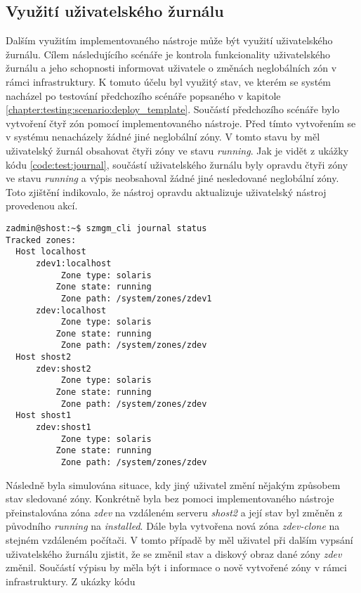 \subsection{Využití uživatelského žurnálu}
\label{chapter:testing:scenario:journal}
Dalším využitím implementovaného nástroje může být využití uživatelského žurnálu. Cílem následujícího scénáře je kontrola 
funkcionality uživatelského žurnálu a jeho schopnosti informovat uživatele o změnách neglobálních zón v rámci infrastruktury.
K tomuto účelu byl využitý stav, ve kterém se systém nacházel po testování předchozího scénáře popsaného v kapitole
\ref{chapter:testing:scenario:deploy_template}. Součástí předchozího scénáře bylo vytvoření čtyř zón pomocí implementovaného
nástroje. Před tímto vytvořením se v systému nenacházely žádné jiné neglobální zóny. V tomto stavu by měl uživatelský žurnál 
obsahovat čtyři zóny ve stavu \textit{running}. Jak je vidět z ukážky kódu \ref{code:test:journal}, součástí uživatelského
žurnálu byly opravdu čtyři zóny ve stavu \textit{running} a výpis neobsahoval žádné jiné nesledované neglobální zóny.
Toto zjištění indikovalo, že nástroj opravdu aktualizuje uživatelský nástroj provedenou akcí.
\begin{lstlisting}[basicstyle=\scriptsize\ttfamily, caption={Uživatelské žurnál po vytvoření zón}, float,label={code:test:journal}]  
zadmin@shost:~$ szmgm_cli journal status
Tracked zones:
  Host localhost
      zdev1:localhost
           Zone type: solaris
          Zone state: running
           Zone path: /system/zones/zdev1
      zdev:localhost
           Zone type: solaris
          Zone state: running
           Zone path: /system/zones/zdev
  Host shost2
      zdev:shost2
           Zone type: solaris
          Zone state: running                      
           Zone path: /system/zones/zdev
  Host shost1
      zdev:shost1
           Zone type: solaris
          Zone state: running
           Zone path: /system/zones/zdev
\end{lstlisting}
Následně byla simulována situace, kdy jiný uživatel změní nějakým způsobem stav sledované zóny. Konkrétně byla bez pomoci 
implementovaného nástroje přeinstalována zóna \textit{zdev} na vzdáleném serveru \textit{shost2} a její stav byl změněn z původního
\textit{running} na \textit{installed}. Dále byla vytvořena nová zóna \textit{zdev-clone} na stejném vzdáleném počítači. V tomto
případě by měl uživatel při dalším vypsání uživatelského žurnálu zjistit, že se změnil stav a diskový obraz dané zóny 
\textit{zdev} změnil. Součástí výpisu by měla být i informace o nově vytvořené zóny v rámci infrastruktury. Z ukázky kódu 

